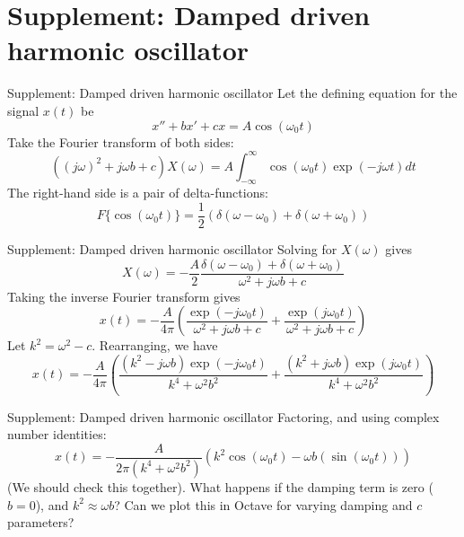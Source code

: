 \documentclass{beamer}
\begin{document}
\section{Supplement: Damped driven harmonic oscillator}

\begin{frame}{Supplement: Damped driven harmonic oscillator}
Let the defining equation for the signal $x(t)$ be
\begin{equation}
x'' + bx' + cx = A\cos(\omega_0 t)
\end{equation}
Take the Fourier transform of both sides:
\begin{equation}
\left((j\omega)^2 + j\omega b + c\right)X(\omega) = A \int_{-\infty}^{\infty} \cos(\omega_0 t) \exp(-j\omega t) dt
\end{equation}
The right-hand side is a pair of delta-functions:
\begin{equation}
F\lbrace \cos(\omega_0 t) \rbrace = \frac{1}{2}\left(\delta(\omega-\omega_0) + \delta(\omega+\omega_0)\right)
\end{equation}
\end{frame}

\begin{frame}{Supplement: Damped driven harmonic oscillator}
\small
Solving for $X(\omega)$ gives
\begin{equation}
X(\omega) = -\frac{A}{2}\frac{\delta(\omega-\omega_0) + \delta(\omega+\omega_0)}{\omega^2 + j\omega b + c}
\end{equation}
Taking the inverse Fourier transform gives
\begin{equation}
x(t) = -\frac{A}{4\pi}\left(\frac{\exp(-j\omega_0 t)}{\omega^2 + j\omega b + c}+\frac{\exp(j\omega_0 t)}{\omega^2 + j\omega b + c}\right)
\end{equation}
Let $k^2 = \omega^2-c$.  Rearranging, we have
\begin{equation}
x(t) = -\frac{A}{4\pi}\left(\frac{(k^2 - j\omega b)\exp(-j\omega_0 t)}{k^4 + \omega^2 b^2}+\frac{(k^2 + j\omega b)\exp(j\omega_0 t)}{k^4 + \omega^2 b^2}\right)
\end{equation}
\end{frame}

\begin{frame}{Supplement: Damped driven harmonic oscillator}
\small
Factoring, and using complex number identities:
\begin{equation}
x(t) = -\frac{A}{2\pi(k^4 +\omega^2b^2)}\left( k^2 \cos(\omega_0 t) - \omega b (\sin(\omega_0 t)) \right)
\end{equation}
(We should check this together).  What happens if the damping term is zero ($b=0$), and $k^2 \approx \omega b$?  Can we plot this in Octave for varying damping and $c$ parameters?
\end{frame}
\end{document}
